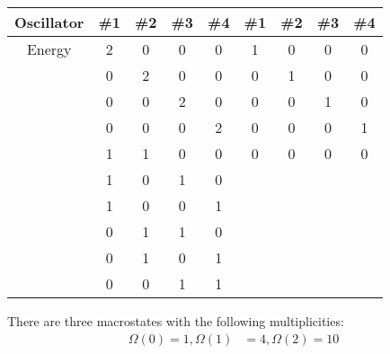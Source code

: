 \documentclass{article}
\begin{document}
\begin{center}
\begin{tabular}{|c|c|c|c|c||c|c|c|c|}
    \hline
    Oscillator & \#1 & \#2 & \#3 & \#4 & \#1 & \#2 & \#3 & \#4 \\
    \hline
    Energy & 2 & 0 & 0 & 0 & 1 & 0 & 0 & 0 \\
    \hline
     & 0 & 2 & 0 & 0 & 0 & 1 & 0 & 0 \\
    \hline
     & 0 & 0 & 2 & 0 & 0 & 0 & 1 & 0 \\
    \hline
     & 0 & 0 & 0 & 2 & 0 & 0 & 0 & 1 \\
    \hline
     & 1 & 1 & 0 & 0 & 0 & 0 & 0 & 0 \\
    \hline
     & 1 & 0 & 1 & 0 & & & & \\
    \hline
     & 1 & 0 & 0 & 1 & & & & \\
    \hline
     & 0 & 1 & 1 & 0 & & & & \\
    \hline
     & 0 & 1 & 0 & 1 & & & & \\
    \hline
     & 0 & 0 & 1 & 1 & & & & \\
     \hline
\end{tabular}
\end{center}

There are three macrostates with the following multiplicities:
\begin{equation}
    \begin{split}
        \Omega\left(0\right) = 1, \Omega\left(1\right) & = 4, \Omega\left(2\right) = 10
    \end{split}
\end{equation}

\clearpage
\end{document}
